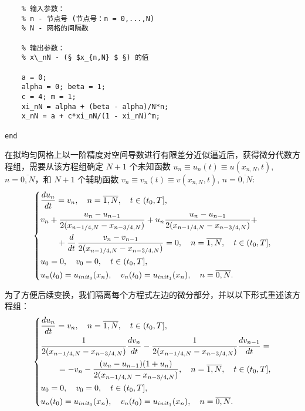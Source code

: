 \documentclass[twoside]{book}
\begin{document}
\begin{CJK*}{GBK}{song}
\begin{lstlisting}
    % 输入参数：
    % n - 节点号 (节点号：n = 0,...,N)
    % N - 网格的间隔数

    % 输出参数：
    % x\_nN - (§ $x_{n,N} $ §) 的值

    a = 0;
    alpha = 0; beta = 1;
    c = 4; m = 1;
    xi_nN = alpha + (beta - alpha)/N*n;
    x_nN = a + c*xi_nN/(1 - xi_nN)^m;

end
\end{lstlisting}



在拟均匀网格上以一阶精度对空间导数进行有限差分近似逼近后，获得微分代数方程组，需要从该方程组确定 $N + 1$ 个未知函数 $u_{n} \equiv  u_{n}(t) \equiv u(x_{n,N},t)$, $n = \overline{0,N}$，和 $N + 1$ 个辅助函数 $v_{n} \equiv  v_{n}(t) \equiv v(x_{n,N},t)$, $n = \overline{0,N}$:
\begin{equation*}
    \left\{
    \begin{aligned}
            &\dfrac{d u_{n}}{d t} = v_n, \quad n = \overline{1,N}, \quad t \in (t_0,T],\\
            &v_n + \dfrac{u_{n} - u_{n - 1}}{2(x_{n - 1/4,N} - x_{n - 3/4,N})} + u_n \dfrac{u_{n} - u_{n - 1}}{2(x_{n - 1/4,N} - x_{n - 3/4,N})} + \\
            &\hspace{0.7cm} + \dfrac{d}{d t} \, \dfrac{v_{n} - v_{n - 1}}{2(x_{n - 1/4,N} - x_{n - 3/4,N})} = 0, \quad n = \overline{1,N}, \quad t \in (t_0,T], \\
            &u_0 = 0, \quad v_0 = 0, \quad t \in (t_0,T], \\
            &u_n(t_0) =  u_{init_0} (x_n), \quad v_n(t_0) =  u_{init_1} (x_n), \quad n = \overline{0,N}. \\
        \end{aligned}
    \right.
\end{equation*}


为了方便后续变换，我们隔离每个方程式左边的微分部分，并以以下形式重述该方程组：
\begin{equation*}
    \left\{
    \begin{aligned}
            &\dfrac{d u_{n}}{d t} = v_n, \quad n = \overline{1,N}, \quad t \in (t_0,T],\\
            &\dfrac{1}{2(x_{n - 1/4,N} - x_{n - 3/4,N})} \dfrac{d v_{n}}{d t} - \dfrac{1}{2(x_{n - 1/4,N} - x_{n - 3/4,N})} \dfrac{d v_{n - 1}}{d t} = \\
            &\hspace{0.7cm} = -v_n - \dfrac{(u_{n} - u_{n - 1})(1 + u_n)}{2(x_{n - 1/4,N} - x_{n - 3/4,N})}, \quad n = \overline{1,N}, \quad t \in (t_0,T], \\
            &u_0 = 0, \quad v_0 = 0, \quad t \in (t_0,T], \\
            &u_n(t_0) =  u_{init_0} (x_n), \quad v_n(t_0) =  u_{init_1} (x_n), \quad n = \overline{0,N}. \\
        \end{aligned}
    \right.
\end{equation*}


\end{CJK*}
\end{document}
